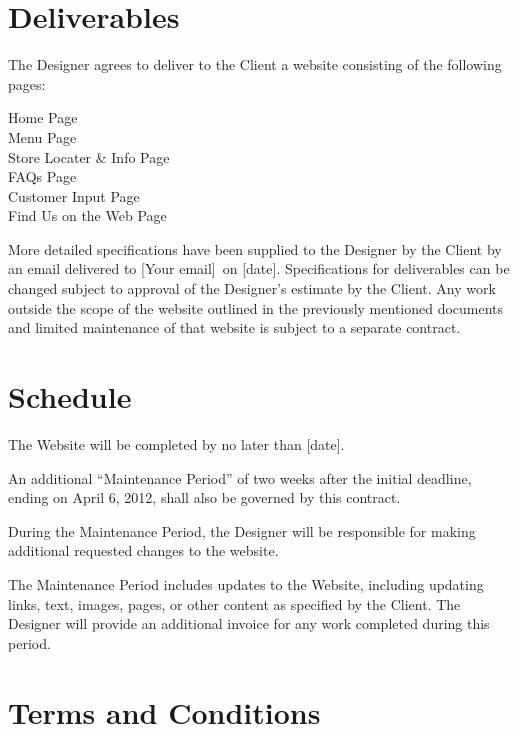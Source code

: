 \documentclass[a4paper,12pt]{article} %
\newcommand{\YourEmail}{[Your email]}
\newcommand{\DeliveryDate}{[date]}
\newcommand{\CompletionDate}{[date]}
\begin{document}
\section{Deliverables}

The Designer agrees to deliver to the Client a website consisting of the following pages:

Home Page\\
Menu Page\\
Store Locater \& Info Page\\
FAQs Page\\
Customer Input Page\\
Find Us on the Web Page

More detailed specifications have been supplied to the Designer by the Client by an email delivered to \YourEmail~on \DeliveryDate. Specifications for deliverables can be changed subject to approval of the Designer's estimate by the Client. Any work outside the scope of the website outlined in the previously mentioned documents and limited maintenance of that website is subject to a separate contract.


\section{Schedule}

The Website will be completed by no later than \CompletionDate.

An additional ``Maintenance Period'' of two weeks after the initial deadline, ending on April 6, 2012, shall also be governed by this contract.

During the Maintenance Period, the Designer will be responsible for making additional requested changes to the website.

The Maintenance Period includes updates to the Website, including updating links, text, images, pages, or other content as specified by the Client. The Designer will provide an additional invoice for any work completed during this period.


\section{Terms and Conditions}
\end{document}
